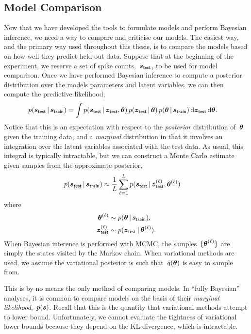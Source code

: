 \subsection{Model Comparison}
Now that we have developed the tools to formulate models and perform
Bayesian inference, we need a way to compare and criticise our models.
The easiest way, and the primary way used throughout this thesis, is
to compare the models based on how well they predict 
held-out data. Suppose that at the beginning of the experiment, we reserve
a set of spike counts,~$\boldsymbol{s}_{\mathsf{test}}$, to be used for model
comparison. Once we have performed Bayesian inference to compute a
posterior distribution over the models parameters and latent variables,
we can then compute the predictive likelihood,
\begin{align}
  \label{eq:predictive_likelihood}
  p(\boldsymbol{s}_{\mathsf{test}} \,|\, \boldsymbol{s}_{\mathsf{train}})
  &= \int p(\boldsymbol{s}_{\mathsf{test}} \,|\, \boldsymbol{z}_{\mathsf{test}}, \boldsymbol{\theta}) \,
  p(\boldsymbol{z}_{\mathsf{test}} \,|\, \boldsymbol{\theta}) \,
  p(\boldsymbol{\theta} \,|\, \boldsymbol{s}_{\mathsf{train}}) \,
  \mathrm{d}\boldsymbol{z}_{\mathsf{test}} \, \mathrm{d} \boldsymbol{\theta}.
\end{align}
Notice that this is an expectation with respect to the \emph{posterior}
distribution of~$\boldsymbol{\theta}$ given the training data, and a \emph{marginal}
distribution in that it involves an integration over the latent variables
associated with the test data. As usual, this integral is typically
intractable, but we can construct a Monte Carlo estimate given 
samples from the approximate posterior,
\begin{align}
  p(\boldsymbol{s}_{\mathsf{test}} \,|\, \boldsymbol{s}_{\mathsf{train}})
  &\approx \frac{1}{L} \sum_{\ell=1}^L
  p(\boldsymbol{s}_{\mathsf{test}} \,|\, \boldsymbol{z}_{\mathsf{test}}^{(\ell)}, \boldsymbol{\theta}^{(\ell)}) \,
\end{align}
where
\begin{align}
  \boldsymbol{\theta}^{(\ell)} &\sim p(\boldsymbol{\theta} \,|\, \boldsymbol{s}_{\mathsf{train}}), \\
  \boldsymbol{z}_{\mathsf{test}}^{(\ell)} &\sim   p(\boldsymbol{z}_{\mathsf{test}} \,|\, \boldsymbol{\theta}^{(\ell)}).
\end{align}
When Bayesian inference is performed with MCMC, the samples~$\{\boldsymbol{\theta}^{(\ell)}\}$
are simply the states visited by the Markov chain. When variational methods
are used, we assume the variational posterior is such that~$q(\boldsymbol{\theta})$ is
easy to sample from.

This is by no means the only method of comparing models. In ``fully
Bayesian'' analyses, it is common to compare models on the basis of
their \emph{marginal likelihood},~$p(\boldsymbol{s})$. Recall that this is the
quantity that variational methods attempt to lower bound. Unfortunately,
we cannot evaluate the tightness of variational lower bounds because
they depend on the KL-divergence, which is intractable.

